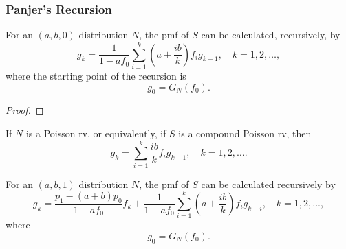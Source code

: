 \documentclass[notoc,notitlepage]{tufte-book}
\begin{document}
\subsubsection{Panjer's Recursion}%
\label{ssub:panjer_s_recursion}

\begin{thm}\label{thm:panjer_s_recursion_for_a_b_0_class}
  For an $(a, b, 0)$ distribution $N$, the pmf of $S$ can be calculated, recursively, by
  \begin{equation*}
    g_k = \frac{1}{1 - af_0} \sum_{i=1}^{k} \left( a + \frac{ib}{k} \right) f_i g_{k - 1}, \quad k = 1, 2, \ldots,
  \end{equation*}
  where the starting point of the recursion is
  \begin{equation*}
    g_0 = G_N(f_0).
  \end{equation*}
\end{thm}

\begin{proof}
\end{proof}

\begin{eg}
  If $N$ is a Poisson rv, or equivalently, if $S$ is a compound Poisson rv, then
  \begin{equation*}
    g_k = \sum_{i=1}^{k} \frac{ib}{k} f_i g_{k - 1}, \quad k = 1, 2, \ldots.
  \end{equation*}
\end{eg}

\begin{thm}\label{thm:panjer_s_recursion_for_a_b_1_class}
  For an $(a, b, 1)$ distribution $N$, the pmf of $S$ can be calculated recursively by
  \begin{equation*}
    g_k = \frac{p_1 - (a + b)p_0}{1 - af_0} f_k + \frac{1}{1 - af_0} \sum_{i=1}^{k} \left( a + \frac{ib}{k} \right) f_i g_{k - i}, \quad k = 1, 2, ...,
  \end{equation*}
  where
  \begin{equation*}
    g_0 = G_N(f_0).
  \end{equation*}
\end{thm}


\end{document}
